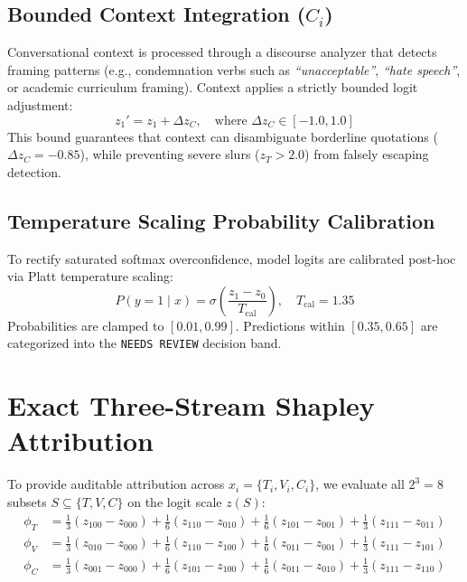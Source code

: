 \documentclass[11pt,a4paper]{article}
\begin{document}
\subsection{Bounded Context Integration ($C_i$)}
Conversational context is processed through a discourse analyzer that detects framing patterns (e.g., condemnation verbs such as \textit{``unacceptable''}, \textit{``hate speech''}, or academic curriculum framing). Context applies a strictly bounded logit adjustment:
\begin{equation}
    z_1' = z_1 + \Delta z_C, \quad \text{where } \Delta z_C \in [-1.0, 1.0]
\end{equation}
This bound guarantees that context can disambiguate borderline quotations ($\Delta z_C = -0.85$), while preventing severe slurs ($z_T > 2.0$) from falsely escaping detection.

\subsection{Temperature Scaling Probability Calibration}
To rectify saturated softmax overconfidence, model logits are calibrated post-hoc via Platt temperature scaling:
\begin{equation}
    P(y = 1 \mid x) = \sigma\left(\frac{z_1 - z_0}{T_{\text{cal}}}\right), \quad T_{\text{cal}} = 1.35
\end{equation}
Probabilities are clamped to $[0.01, 0.99]$. Predictions within $[0.35, 0.65]$ are categorized into the \texttt{NEEDS REVIEW} decision band.

\section{Exact Three-Stream Shapley Attribution}
To provide auditable attribution across $x_i = \{T_i, V_i, C_i\}$, we evaluate all $2^3 = 8$ subsets $S \subseteq \{T, V, C\}$ on the logit scale $z(S)$:
\begin{align}
    \phi_T &= \frac{1}{3}(z_{100} - z_{000}) + \frac{1}{6}(z_{110} - z_{010}) + \frac{1}{6}(z_{101} - z_{001}) + \frac{1}{3}(z_{111} - z_{011}) \\
    \phi_V &= \frac{1}{3}(z_{010} - z_{000}) + \frac{1}{6}(z_{110} - z_{100}) + \frac{1}{6}(z_{011} - z_{001}) + \frac{1}{3}(z_{111} - z_{101}) \\
    \phi_C &= \frac{1}{3}(z_{001} - z_{000}) + \frac{1}{6}(z_{101} - z_{100}) + \frac{1}{6}(z_{011} - z_{010}) + \frac{1}{3}(z_{111} - z_{110})
\end{align}
\end{document}

